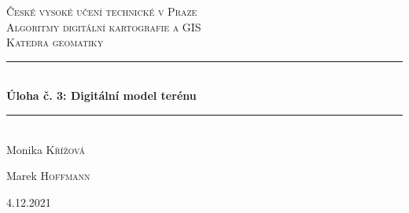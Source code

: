 \documentclass[11pt]{article}
\begin{document}

\begin{titlepage} %
	\newcommand{\HRule}{\rule{\linewidth}{0.5mm}} %
	
	\center %
	
	
	\textsc{\LARGE České vysoké učení technické v Praze}\\[1.5cm] %
	
	\textsc{\Large Algoritmy digitální kartografie a GIS}\\[0.5cm] %
	
	\textsc{\large Katedra geomatiky}\\[0.5cm] %
	
	
	\HRule\\[0.4cm]
	
	{\huge\bfseries Úloha č. 3: Digitální model terénu}\\[0.4cm] %
	
	\HRule\\[1.5cm]
	
	
	

	
	Monika \textsc{Křížová} %
	
	Marek \textsc{Hoffmann}
	
	
	\vfill\vfill\vfill %
	
	{\large 4.12.2021} %
	
	
	 
	
	\vfill %
	
\end{titlepage}
\end{document}
